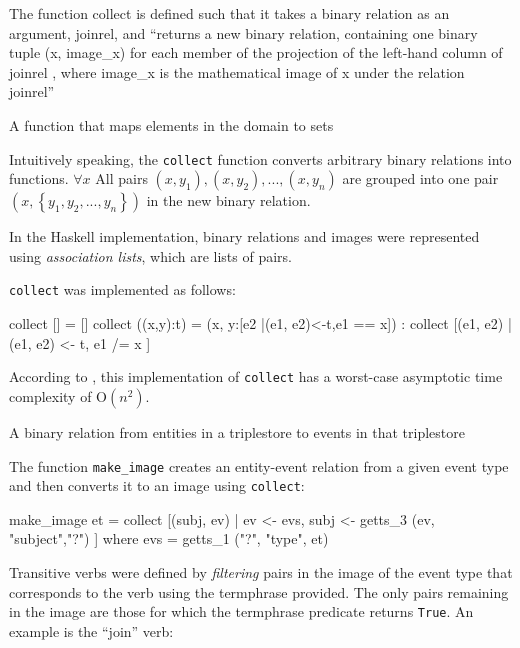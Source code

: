 \documentclass[../main.tex]{subfiles}
\begin{document}
\begin{definition}
The function collect is defined such that it takes a binary relation as an
argument, joinrel, and ``returns a new binary relation, containing one binary tuple
(x, image\_x) for each member of the projection of the left-hand column of joinrel
, where image\_x is the mathematical image of x under the relation joinrel''\cite{frost2014denotational}
\end{definition}

\begin{definition}
  A function that maps elements in the domain to sets
\end{definition}

Intuitively speaking, the \texttt{collect} function converts arbitrary binary
relations into functions.  $\forall x$ All pairs $(x, y_1), (x, y_2), ..., (x,
y_n)$ are grouped into one pair $(x, \left\{y_1, y_2, ..., y_n\right\})$ in the new binary
relation.

In the Haskell implementation, binary relations and images were represented using {\em association
lists}, which are lists of pairs\cite{frost2014denotational}.

\texttt{collect} was implemented as follows:

\begin{code}
	collect [] = []
	collect ((x,y):t) = (x, y:[e2 |(e1, e2)<-t,e1 == x])
		: collect [(e1, e2) | (e1, e2) <- t, e1 /= x ]
\end{code}

According to \cite{agboola2015extensible}, this implementation of \texttt{collect} has a worst-case asymptotic time complexity of
O$(n^2)$.

\begin{definition}
  A binary relation from entities in a triplestore to events in that triplestore
\end{definition}

The function \texttt{make\_image} creates an entity-event relation from a given event type and then converts it to an image using \texttt{collect}:

\begin{code}
  make_image et = collect
    [(subj, ev) | ev <- evs, subj <- getts_3 (ev, "subject","?") ]
	  where evs = getts_1 ("?", "type",  et)
\end{code}

Transitive verbs were defined by {\em filtering} pairs in the image of the event
type that corresponds to the verb using the termphrase provided.  The only pairs remaining in the image are those
for which the termphrase predicate returns \texttt{True}.  An example is the
``join'' verb:
\end{document}
